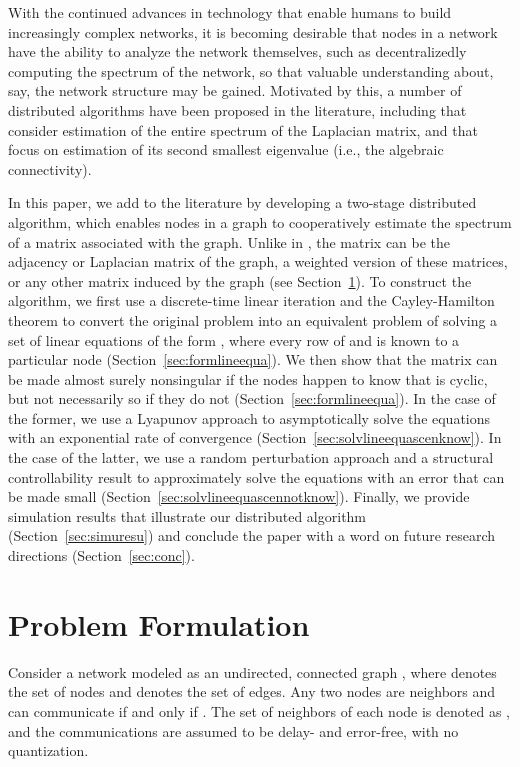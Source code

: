 \documentclass[11pt]{article}
\theoremstyle{plain}
\theoremstyle{definition}
\theoremstyle{remark}
\begin{document}
With the continued advances in technology that enable humans to build increasingly complex networks, it is becoming desirable that nodes in a network have the ability to analyze the network themselves, such as decentralizedly computing the spectrum of the network, so that valuable understanding about, say, the network structure may be gained. Motivated by this, a number of distributed algorithms have been proposed in the literature, including \cite{Sahai12, Franceschelli13, TranTMD14} that consider estimation of the entire spectrum of the Laplacian matrix, and \cite{YangP10, Aragues12, LiC13} that focus on estimation of its second smallest eigenvalue (i.e., the algebraic connectivity).

In this paper, we add to the literature by developing a two-stage distributed algorithm, which enables nodes in a graph to cooperatively estimate the spectrum of a matrix  associated with the graph. Unlike in \cite{Sahai12, Franceschelli13, TranTMD14, YangP10, Aragues12, LiC13}, the matrix  can be the adjacency or Laplacian matrix of the graph, a weighted version of these matrices, or any other matrix induced by the graph (see Section~\ref{sec:probform}). To construct the algorithm, we first use a discrete-time linear iteration and the Cayley-Hamilton theorem to convert the original problem into an equivalent problem of solving a set of linear equations of the form , where every row of  and  is known to a particular node (Section~\ref{sec:formlineequa}). We then show that the matrix  can be made almost surely nonsingular if the nodes happen to know that  is cyclic, but not necessarily so if they do not (Section~\ref{sec:formlineequa}). In the case of the former, we use a Lyapunov approach to asymptotically solve the equations with an exponential rate of convergence (Section~\ref{sec:solvlineequascenknow}). In the case of the latter, we use a random perturbation approach and a structural controllability result to approximately solve the equations with an error that can be made small (Section~\ref{sec:solvlineequascennotknow}). Finally, we provide simulation results that illustrate our distributed algorithm (Section~\ref{sec:simuresu}) and conclude the paper with a word on future research directions (Section~\ref{sec:conc}).

\section{Problem Formulation}\label{sec:probform}

Consider a network modeled as an undirected, connected graph , where  denotes the set of  nodes and  denotes the set of edges. Any two nodes  are neighbors and can communicate if and only if . The set of neighbors of each node  is denoted as , and the communications are assumed to be delay- and error-free, with no quantization.
\end{document}
